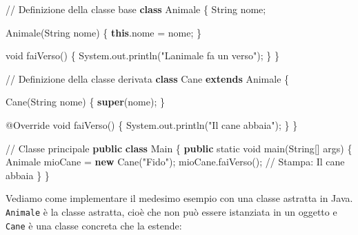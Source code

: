 \documentclass[
  letterpaper,
]{scrbook}
\newenvironment{Shaded}{\begin{snugshade}}{\end{snugshade}}
\newcommand{\AttributeTok}[1]{\textcolor[rgb]{0.40,0.45,0.13}{#1}}
\newcommand{\BuiltInTok}[1]{\textcolor[rgb]{0.00,0.23,0.31}{#1}}
\newcommand{\CommentTok}[1]{\textcolor[rgb]{0.37,0.37,0.37}{#1}}
\newcommand{\DataTypeTok}[1]{\textcolor[rgb]{0.68,0.00,0.00}{#1}}
\newcommand{\FunctionTok}[1]{\textcolor[rgb]{0.28,0.35,0.67}{#1}}
\newcommand{\KeywordTok}[1]{\textcolor[rgb]{0.00,0.23,0.31}{\textbf{#1}}}
\newcommand{\NormalTok}[1]{\textcolor[rgb]{0.00,0.23,0.31}{#1}}
\newcommand{\OperatorTok}[1]{\textcolor[rgb]{0.37,0.37,0.37}{#1}}
\newcommand{\StringTok}[1]{\textcolor[rgb]{0.13,0.47,0.30}{#1}}
\begin{document}
\begin{Shaded}
\begin{Highlighting}[]
\CommentTok{// Definizione della classe base}
\KeywordTok{class}\NormalTok{ Animale }\OperatorTok{\{}
    \BuiltInTok{String}\NormalTok{ nome}\OperatorTok{;}

    \FunctionTok{Animale}\OperatorTok{(}\BuiltInTok{String}\NormalTok{ nome}\OperatorTok{)} \OperatorTok{\{}
        \KeywordTok{this}\OperatorTok{.}\FunctionTok{nome} \OperatorTok{=}\NormalTok{ nome}\OperatorTok{;}
    \OperatorTok{\}}

    \DataTypeTok{void} \FunctionTok{faiVerso}\OperatorTok{()} \OperatorTok{\{}
        \BuiltInTok{System}\OperatorTok{.}\FunctionTok{out}\OperatorTok{.}\FunctionTok{println}\OperatorTok{(}\StringTok{"L\textquotesingle{}animale fa un verso"}\OperatorTok{);}
    \OperatorTok{\}}
\OperatorTok{\}}

\CommentTok{// Definizione della classe derivata}
\KeywordTok{class}\NormalTok{ Cane }\KeywordTok{extends}\NormalTok{ Animale }\OperatorTok{\{}

    \FunctionTok{Cane}\OperatorTok{(}\BuiltInTok{String}\NormalTok{ nome}\OperatorTok{)} \OperatorTok{\{}
        \KeywordTok{super}\OperatorTok{(}\NormalTok{nome}\OperatorTok{);}
    \OperatorTok{\}}

    \AttributeTok{@Override}
    \DataTypeTok{void} \FunctionTok{faiVerso}\OperatorTok{()} \OperatorTok{\{}
        \BuiltInTok{System}\OperatorTok{.}\FunctionTok{out}\OperatorTok{.}\FunctionTok{println}\OperatorTok{(}\StringTok{"Il cane abbaia"}\OperatorTok{);}
    \OperatorTok{\}}
\OperatorTok{\}}

\CommentTok{// Classe principale}
\KeywordTok{public} \KeywordTok{class}\NormalTok{ Main }\OperatorTok{\{}
    \KeywordTok{public} \DataTypeTok{static} \DataTypeTok{void} \FunctionTok{main}\OperatorTok{(}\BuiltInTok{String}\OperatorTok{[]}\NormalTok{ args}\OperatorTok{)} \OperatorTok{\{}
\NormalTok{        Animale mioCane }\OperatorTok{=} \KeywordTok{new} \FunctionTok{Cane}\OperatorTok{(}\StringTok{"Fido"}\OperatorTok{);}
\NormalTok{        mioCane}\OperatorTok{.}\FunctionTok{faiVerso}\OperatorTok{();} \CommentTok{// Stampa: Il cane abbaia}
    \OperatorTok{\}}
\OperatorTok{\}}
\end{Highlighting}
\end{Shaded}

Vediamo come implementare il medesimo esempio con una classe astratta in
Java. \texttt{Animale} è la classe astratta, cioè che non può essere
istanziata in un oggetto e \texttt{Cane} è una classe concreta che la
estende:
\end{document}
